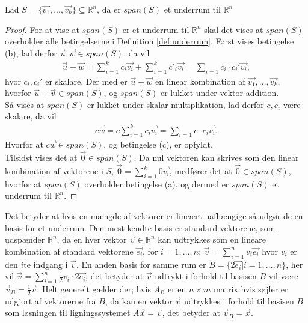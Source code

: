 \begin{stn}
Lad $S=\{\vec{v_1},...,\vec{v_k}\} \subseteq \mathds{R}^n$, da er $span(S)$ et underrum til $\mathds{R}^n$
\label{stn:spanunderrum}
\end{stn}
\begin{proof}
For at vise at $span(S)$ er et underrum til $\mathds{R}^n$ skal det vises at $span(S)$ overholder alle betingelserne i Definition \ref{def:underrum}.
Først vises betingelse (b), lad  derfor $\vec{u}, \vec{w} \in span(S)$, da vil 
\begin{align*}
\vec{u}+\vec{w}= \sum_{i=1}^k c_i \vec{v_i} + \sum_{i=1}^k c'_i \vec{v_i} = \sum_{i=1} c_i\cdot c_i' \vec{v_i},
\end{align*}
hvor $c_i, c_i'$ er skalare.
Der med er $\vec{u}+\vec{w}$ en linear kombination af $\vec{v_1},...,\vec{v_k}$, hvorfor $\vec{u}+\vec{v} \in span(S)$, og $span(S)$ er lukket under vektor addition.
\\ Så vises at $span(S)$ er lukket under skalar multiplikation, lad derfor $c, c_i$ være skalare, da vil
\begin{align*}
c\vec{w}= c\sum_{i=1}^k c_i \vec{v_i}  = \sum_{i=1} c \cdot c_i \vec{v_i}.
\end{align*}
Hvorfor at $c\vec{w} \in span(S)$, og betingelse (c), er opfyldt.
\\Tilsidst vises det at $\vec{0} \in span(S)$.
Da nul vektoren kan skrives som den linear kombination af vektorene i $S$, $\vec{0} = \sum_{i=1}^k 0 \vec{v_i}$, medfører det at $\vec{0} \in span(S)$, hvorfor at $span(S)$ overholder betingelse (a), og dermed er $span(S)$ et underrum til $\mathds{R}^n$.
\end{proof}
Det betyder at hvis en mængde af vektorer er lineært uafhængige så udgør de en basis for et underrum. 
Den mest kendte basis er standard vektorene, som udspænder $\mathds{R}^n$, da en hver vektor $\vec{v} \in \mathds{R}^n$ kan udtrykkes som en lineare kombination af standard vektorene $\vec{e_i}$, for $i = 1,..., n$; $\vec{v}= \sum_{i=1}^n v_i \vec{e_i}$ hvor $v_i$ er den $i$te indgang i $\vec{v}$.
En anden basis for samme rum er $B=\{2\vec{e_i}| i =1,...,n\}$, her vil $\vec{v} = \sum_{i=1}^n \frac{1}{2} v_i \cdot 2\vec{e_i}$, det betyder at $\vec{v}$ udtrykt i forhold til basisen $B$ vil være $\vec{v}_B = \frac{1}{2}\vec{v}$.
Helt generelt gælder der; hvis $A_B$ er en $n \times m$ matrix hvis søjler er udgjort af vektorerne fra $B$, da kan en vektor $\vec{v}$ udtrykkes i forhold til basisen $B$ som løsningen til ligningssystemet $A \vec{x} =\vec{v}$, det betyder at $\vec{v}_B =  \vec{x}$. 

